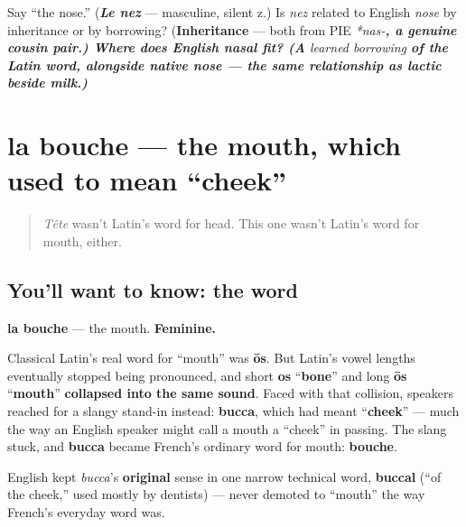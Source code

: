\begin{tcolorbox}[breakable,colback=teal!4,colframe=teal!35!black,title={Before you move on}]
Say \textquotedblleft{}the nose.\textquotedblright{} (\emph{\textbf{Le nez}} — masculine, silent z.) Is \emph{nez} related to English \emph{nose} by inheritance or by borrowing? (\textbf{Inheritance} — both from PIE \emph{*nas-\emph{\textbf{, a genuine cousin pair.) Where does English \emph{nasal} fit? (A }learned borrowing\textbf{ of the Latin word, alongside native \emph{nose} — the same relationship as \emph{lactic} beside \emph{milk}.)}}}
\end{tcolorbox}
\section[la bouche]{la bouche — the mouth, which used to mean \textquotedblleft{}cheek\textquotedblright{}}

\label{lesson:FR-C31-bouche}



\begin{quote}
\emph{Tête} wasn't Latin's word for head. This one wasn't Latin's word for mouth, either.
\end{quote}

\subsection*{You'll want to know: the word}
\textbf{la bouche} — the mouth. \textbf{Feminine.}

\begin{cousinweb}
Classical Latin's real word for \textquotedblleft{}mouth\textquotedblright{} was \textbf{ōs}. But Latin's vowel lengths eventually stopped being pronounced, and short \textbf{os} \textquotedblleft{}\textbf{bone}\textquotedblright{} and long \textbf{ōs} \textquotedblleft{}\textbf{mouth}\textquotedblright{} \textbf{collapsed into the same sound}. Faced with that collision, speakers reached for a slangy stand-in instead: \textbf{bucca}, which had meant \textquotedblleft{}\textbf{cheek}\textquotedblright{} — much the way an English speaker might call a mouth a \textquotedblleft{}cheek\textquotedblright{} in passing. The slang stuck, and \textbf{bucca} became French's ordinary word for mouth: \textbf{bouche}.

English kept \emph{bucca}'s \textbf{original} sense in one narrow technical word, \textbf{buccal} (\textquotedblleft{}of the cheek,\textquotedblright{} used mostly by dentists) — never demoted to \textquotedblleft{}mouth\textquotedblright{} the way French's everyday word was.
\end{cousinweb}

